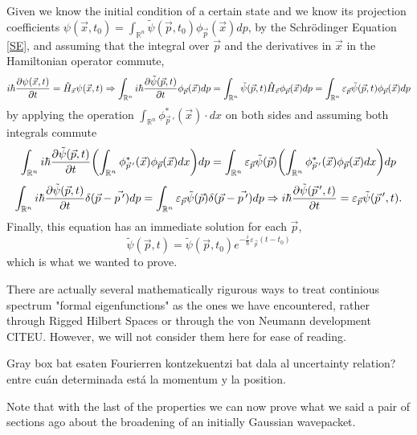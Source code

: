 \documentclass[11pt, a4paper]{article} %
\newcommand{\R}{\mathbb{R}} %
\DeclareRobustCommand{\mybox}[2][gray!10]{%
\begin{tcolorbox}[   %
        left=0.2cm,
        right=0.2cm,
        top=0.15cm,
        bottom=0.15cm,
        colback=#1,
        colframe=#1,
        width=\dimexpr\textwidth\relax, 
        enlarge left by=0mm,
        boxsep=5pt,
        arc=0pt,outer arc=0pt,
        ]
        #2
\end{tcolorbox}
}
\begin{document}
\begin{itemize}
\mybox{
Given we know the initial condition of a certain state and we know its projection coefficients $\psi(\vec{x},t_0)=\int_{\R^n}\tilde{\psi}(\vec{p},t_0)\phi_{\vec{p}}(\vec{x})dp$, by the Schrödinger Equation \eqref{SE}, and assuming that the integral over $\vec{p}$ and the derivatives in $\vec{x}$ in the Hamiltonian operator commute,
\begin{equation}
i\hbar\pdv{\psi(\vec{x},t)}{t}=\hat{H}_{\vec{x}}\psi(\vec{x},t)\Rightarrow \int_{\R^n}i\hbar\pdv{\tilde{\psi}(\vec{p},t)}{t}\phi_{\vec{p}}(\vec{x})dp =\int_{\R^n}\tilde{\psi}(\vec{p},t)\hat{H}_{\vec{x}}\phi_{\vec{p}}(\vec{x})dp=\int_{\R^n}\varepsilon_{\vec{p}}\tilde{\psi}(\vec{p},t)\phi_{\vec{p}}(\vec{x})dp
\end{equation}
by applying the operation $\int_{\R^n}\phi_{\vec{p}\,'}^*(\vec{x})\cdot dx$ on both sides and assuming both integrals commute
\begin{equation}
 \int_{\R^n}i\hbar\pdv{\tilde{\psi}(\vec{p},t)}{t}\qty(\int_{\R^n}\phi_{\vec{p}\,'}^*(\vec{x})\phi_{\vec{p}}(\vec{x})dx)dp=\int_{\R^n}\varepsilon_{\vec{p}}\tilde{\psi}(\vec{p})\qty(\int_{\R^n}\phi_{\vec{p}\,'}^*(\vec{x})\phi_{\vec{p}}(\vec{x})dx)dp
\end{equation}
$$
 \int_{\R^n}i\hbar\pdv{\tilde{\psi}(\vec{p},t)}{t}\delta(\vec{p}-\vec{p\,'})dp=\int_{\R^n}\varepsilon_{\vec{p}}\tilde{\psi}(\vec{p})\delta(\vec{p}-\vec{p\,'})dp\Rightarrow  i\hbar\pdv{\tilde{\psi}(\vec{p}\,',t)}{t}=\varepsilon_{\vec{p}}\tilde{\psi}(\vec{p}\,',t).
$$
Finally, this equation has an immediate solution for each $\vec{p}$,
\begin{equation}
\tilde{\psi}(\vec{p},t)=\tilde{\psi}(\vec{p},t_0)e^{-\frac{i}{\hbar}\varepsilon_{\vec{p}}(t-t_0)}
\end{equation}
which is what we wanted to prove.

}
\end{itemize}
There are actually several mathematically rigurous ways to treat continious spectrum "formal eigenfunctions" as the ones we have encountered, rather through Rigged Hilbert Spaces or through the von Neumann development CITEU. However, we will not consider them here for ease of reading.

Gray box bat esaten Fourierren kontzekuentzi bat dala al uncertainty relation? entre cuán determinada está la momentum y la position.

Note that with the last of the properties we can now prove what we said a pair of sections ago about the broadening of an initially Gaussian wavepacket.
\end{document}
